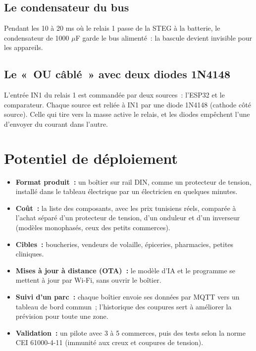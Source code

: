 \documentclass[10pt,a4paper]{article}
\begin{document}
\subsection{Le condensateur du bus}
Pendant les 10 à 20 ms où le relais 1 passe de la STEG à la batterie, le condensateur de 1000 $\mu$F garde le bus alimenté~: la bascule devient invisible pour les appareils.

\subsection{Le «~OU câblé~» avec deux diodes 1N4148}
L'entrée IN1 du relais 1 est commandée par deux sources~: l'ESP32 et le comparateur. Chaque source est reliée à IN1 par une diode 1N4148 (cathode côté source). Celle qui tire vers la masse active le relais, et les diodes empêchent l'une d'envoyer du courant dans l'autre.

\section{Potentiel de déploiement}
\begin{itemize}
  \item \textbf{Format produit~:} un boîtier sur rail DIN, comme un protecteur de tension, installé dans le tableau électrique par un électricien en quelques minutes.
  \item \textbf{Coût~:} la liste des composants, avec les prix tunisiens réels, comparée à l'achat séparé d'un protecteur de tension, d'un onduleur et d'un inverseur (modèles monophasés, ceux des petits commerces).
  \item \textbf{Cibles~:} boucheries, vendeurs de volaille, épiceries, pharmacies, petites cliniques.
  \item \textbf{Mises à jour à distance (OTA)~:} le modèle d'IA et le programme se mettent à jour par Wi-Fi, sans ouvrir le boîtier.
  \item \textbf{Suivi d'un parc~:} chaque boîtier envoie ses données par MQTT vers un tableau de bord commun~; l'historique des coupures sert à améliorer la prévision pour toute une zone.
  \item \textbf{Validation~:} un pilote avec 3 à 5 commerces, puis des tests selon la norme CEI 61000-4-11 (immunité aux creux et coupures de tension).
\end{itemize}
\end{document}
